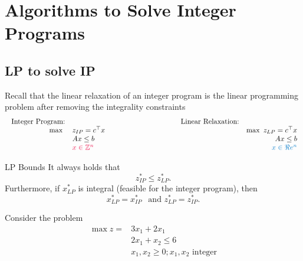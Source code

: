 
%
%

\chapter{Algorithms to Solve Integer Programs}
\label{sec:IP-algorithms}
\section{LP to solve IP}

Recall that the linear relaxation of an integer program is the linear programming problem after removing the integrality constraints
$$
\begin{array}{rlclr}
\text{ Integer Program:} & & & \text{Linear Relaxation:}\\
\max \ & z_{IP} = c^\top x & \hspace{3cm} & & \max \  z_{LP} = c^\top x \\
& Ax \leq b & & & Ax \leq b\\
& \tred{x \in \Z^n} & & & \tblue{x \in \R^n}
\end{array}
$$

\begin{theorem}{LP Bounds}{}
It always holds that 
\begin{equation}
z^*_{IP} \leq z^*_{LP}.
\end{equation}
Furthermore, if $x^*_{LP}$ is integral (feasible for the integer program), then 
\begin{equation}
x^*_{LP} = x^*_{IP} \ \ \text{ and } z^*_{LP} = z^*_{IP}.
\end{equation}
\end{theorem}

\begin{example}{}{}

%
\begin{minipage}[t]{0.5\textwidth}
Consider the problem 
\begin{align*}
\max z = & 3x_1 + 2x_1\\
& 2x_1 + x_2 \leq 6\\
& x_1, x_2 \geq 0; x_1, x_2 \text{ integer}
\end{align*}
\end{minipage}
%
\begin{minipage}[t]{0.4\textwidth}
\end{minipage}
\end{example}


